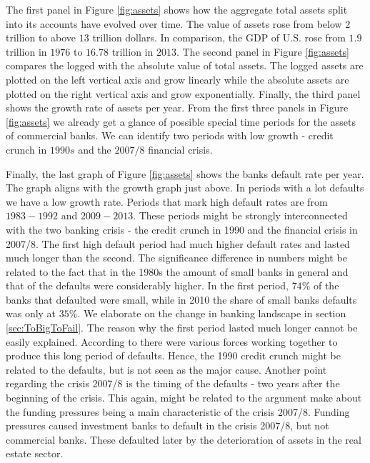 \documentclass[12pt, a4paper]{article} %
\begin{document}
 
The first panel in Figure \ref{fig:assets} shows how the aggregate total assets split into its accounts have evolved over time. The value of assets rose from below $2$ trillion to above $13$ trillion dollars. In comparison, the GDP of U.S. rose from $1.9$ trillion in $1976$ to $16.78$ trillion in $2013$. The second panel in Figure \ref{fig:assets} compares the logged with the absolute value of total assets. The logged assets are plotted on the left vertical axis and grow linearly while the absolute assets are plotted on the right vertical axis and grow exponentially. Finally, the third panel shows the growth rate of assets per year. From the first three panels in Figure \ref{fig:assets} we already get a glance of possible special time periods for the assets of commercial banks. We can identify two periods with low growth - credit crunch in $1990s$ and the $2007/8$ financial crisis. 
  


\iffalse
Finally, the last graph of Figure \ref{fig:assets} shows the banks default rate per year. The graph aligns with the growth graph just above. In periods with a lot defaults we have a low growth rate. Periods that mark high default rates are from $1983-1992$ and $2009-2013$. These periods might be strongly interconnected with the two banking crisis - the credit crunch in 1990 and the financial crisis in 2007/8. The first high default period had much higher default rates and lasted much longer than the second.
The significance difference in numbers might be related to the fact that in the 1980s the amount of small banks in general and that of the defaults were considerably higher.  In the first period, $74\%$ of the banks that defaulted were small, while in 2010 the share of small banks defaults was only at $35\%$. We elaborate on the change in banking landscape in section \ref{sec:ToBigToFail}. The reason why the first period lasted much longer cannot be easily explained. According to \citet{federal1997history} there were various forces working together to produce this long period of defaults. Hence, the 1990 credit crunch might be related to the defaults, but is not seen as the major cause.
Another point regarding the crisis 2007/8 is the timing of the defaults - two years after the beginning of the crisis. This again, might be related to the argument \citet{antoniades2019commercial} make about the funding pressures being a main characteristic of the crisis 2007/8. Funding pressures caused investment banks to default in the crisis 2007/8, but not commercial banks. These defaulted later by the deterioration of assets in the real estate sector.
\end{document}
